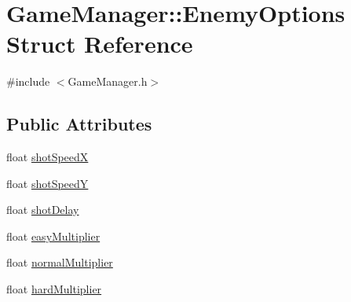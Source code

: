 \hypertarget{struct_game_manager_1_1_enemy_options}{
\section{GameManager::EnemyOptions Struct Reference}
\label{d9/dd3/struct_game_manager_1_1_enemy_options}
}


{\ttfamily \#include $<$GameManager.h$>$}

\subsection*{Public Attributes}
\begin{DoxyCompactItemize}
\item 
float \hyperlink{struct_game_manager_1_1_enemy_options_a4ec75396623519e2a475cc4d0233af56}{shotSpeedX}
\item 
float \hyperlink{struct_game_manager_1_1_enemy_options_a106474977775d14f825ef21a90e77094}{shotSpeedY}
\item 
float \hyperlink{struct_game_manager_1_1_enemy_options_a751ac940c54fb14b33d75015cb5e7239}{shotDelay}
\item 
float \hyperlink{struct_game_manager_1_1_enemy_options_a729016937f52d23ded5de91e1e9afefe}{easyMultiplier}
\item 
float \hyperlink{struct_game_manager_1_1_enemy_options_a591f4b05735d2e32b330f5e2680d4719}{normalMultiplier}
\item 
float \hyperlink{struct_game_manager_1_1_enemy_options_a1b3e4459a84d6f5682f31863bd508a19}{hardMultiplier}
\end{DoxyCompactItemize}



